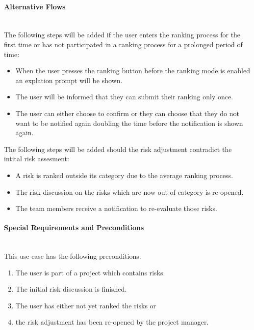 \paragraph*{Alternative Flows}\mbox{}\\

	The following steps will be added if the user enters the ranking process for the first time or has not participated in a ranking process for a prolonged period of time:
\begin{itemize}
	\vspace{-3mm}
	\setlength\itemsep{-1em}
	\item When the user presses the ranking button before the ranking mode is enabled an explation prompt will be shown.
	\item The user will be informed that they can submit their ranking only once.
	\item The user can either choose to confirm or they can choose that they do not want to be notified again doubling the time before the notification is shown again.
\end{itemize}
	
	The following steps will be added should the risk adjustment contradict the intital risk assesment:
\begin{itemize}
	\vspace{-3mm}
	\setlength\itemsep{-1em}
	\item A risk is ranked outside its category due to the average ranking process.
	\item The risk discussion on the risks which are now out of category is re-opened.
	\item The team members receive a notification to re-evaluate those risks.
\end{itemize}


\paragraph*{Special Requirements and Preconditions}\mbox{}\\
This use case has the following preconditions:
\begin{enumerate}
	\vspace{-3mm}
	\setlength\itemsep{-1em}
	\item The user is part of a project which contains risks.
	\item The initial risk discussion is finished.
	\item The user has either not yet ranked the risks or 
	\item the risk adjustment has been re-opened by the project manager.
\end{enumerate}

